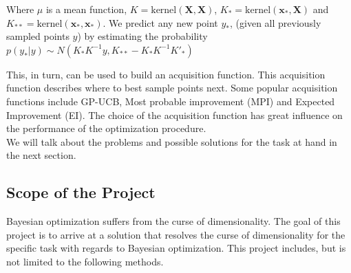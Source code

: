 Where $\mu$ is a mean function, $K = \text{kernel}(\mathbf{X}, \mathbf{X})$, $K_* = \text{kernel}(\mathbf{x_*}, \mathbf{X})$ and $K_{**} = \text{kernel}(\mathbf{x_*}, \mathbf{x_*})$.
We predict any new point $y_*$, (given all previously sampled points $y$) by estimating the probability $ p(y_*|y) \sim N(K_*K^{-1}y,K_{**}-K_*K^{-1}K'_*) $

This, in turn, can be used to build an acquisition function. 
This acquisition function describes where to best sample points next.
Some popular acquisition functions include GP-UCB, Most probable improvement (MPI) and Expected Improvement (EI).
The choice of the acquisition function has great influence on the performance of the optimization procedure.\\

We will talk about the problems and possible solutions for the task at hand in the next section.

\subsection{Scope of the Project}

Bayesian optimization suffers from the curse of dimensionality. 
The goal of this project is to arrive at a solution that resolves the curse of dimensionality for the specific task with regards to Bayesian optimization.
This project includes, but is not limited to the following methods.\\

